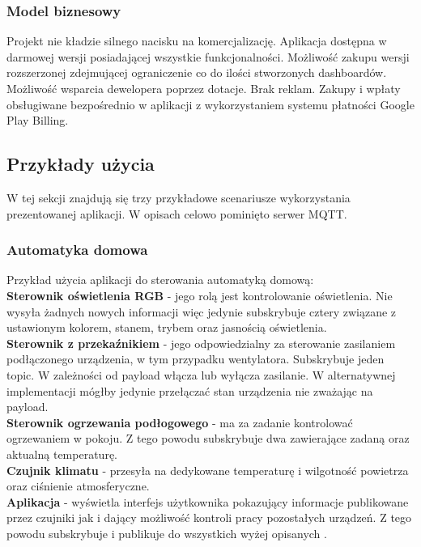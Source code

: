 \subsubsection{Model biznesowy}
Projekt nie kładzie silnego nacisku na komercjalizację. Aplikacja dostępna w darmowej wersji posiadającej wszystkie funkcjonalności. Możliwość zakupu wersji rozszerzonej zdejmującej ograniczenie co do ilości stworzonych dashboardów. Możliwość wsparcia dewelopera poprzez dotacje. Brak reklam. Zakupy i wpłaty obsługiwane bezpośrednio w aplikacji z wykorzystaniem systemu płatności Google Play Billing.

\newpage

\subsection{Przykłady użycia}
W tej sekcji znajdują się trzy przykładowe scenariusze wykorzystania prezentowanej aplikacji. W opisach celowo pominięto serwer MQTT.

\subsubsection{Automatyka domowa}
Przykład użycia aplikacji do sterowania automatyką domową:\\

\textbf{Sterownik oświetlenia RGB} - jego rolą jest kontrolowanie oświetlenia. Nie wysyła żadnych nowych informacji więc jedynie subskrybuje cztery  związane z ustawionym kolorem, stanem, trybem oraz jasnością oświetlenia.\\

\textbf{Sterownik z przekaźnikiem} - jego odpowiedzialny za sterowanie zasilaniem podłączonego urządzenia, w tym przypadku wentylatora. Subskrybuje jeden topic. W zależności od payload włącza lub wyłącza zasilanie. W alternatywnej implementacji mógłby jedynie przełączać stan urządzenia nie zważając na payload.\\

\textbf{Sterownik ogrzewania podłogowego} - ma za zadanie kontrolować ogrzewaniem w pokoju. Z tego powodu subskrybuje dwa  zawierające zadaną oraz aktualną temperaturę.\\

\textbf{Czujnik klimatu} - przesyła na dedykowane  temperaturę i wilgotność powietrza oraz ciśnienie atmosferyczne.\\

\textbf{Aplikacja} - wyświetla interfejs użytkownika pokazujący informacje publikowane przez czujniki jak i dający możliwość kontroli pracy pozostałych urządzeń. Z tego powodu subskrybuje i publikuje do wszystkich wyżej opisanych .\\

